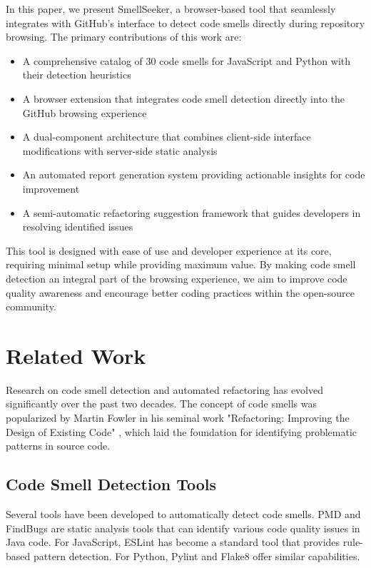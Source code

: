 \documentclass[sigconf,screen]{acmart}
\begin{document}
In this paper, we present SmellSeeker, a browser-based tool that seamlessly integrates with GitHub's interface to detect code smells directly during repository browsing. The primary contributions of this work are:

\begin{itemize}
    \item A comprehensive catalog of 30 code smells for JavaScript and Python with their detection heuristics
    \item A browser extension that integrates code smell detection directly into the GitHub browsing experience
    \item A dual-component architecture that combines client-side interface modifications with server-side static analysis
    \item An automated report generation system providing actionable insights for code improvement
    \item A semi-automatic refactoring suggestion framework that guides developers in resolving identified issues
\end{itemize}

This tool is designed with ease of use and developer experience at its core, requiring minimal setup while providing maximum value. By making code smell detection an integral part of the browsing experience, we aim to improve code quality awareness and encourage better coding practices within the open-source community.

\section{Related Work}

Research on code smell detection and automated refactoring has evolved significantly over the past two decades. The concept of code smells was popularized by Martin Fowler in his seminal work "Refactoring: Improving the Design of Existing Code" \cite{fowler1999refactoring}, which laid the foundation for identifying problematic patterns in source code.

\subsection{Code Smell Detection Tools}

Several tools have been developed to automatically detect code smells. PMD \cite{pmd2021} and FindBugs \cite{ayewah2008using} are static analysis tools that can identify various code quality issues in Java code. For JavaScript, ESLint \cite{eslint2021} has become a standard tool that provides rule-based pattern detection. For Python, Pylint \cite{pylint2021} and Flake8 \cite{flake82021} offer similar capabilities.
\end{document}

